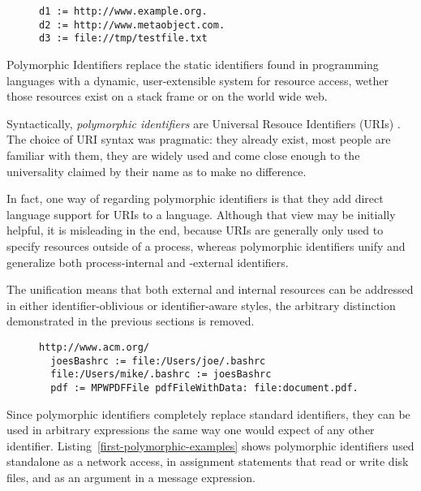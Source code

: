 \documentclass[preprint,authoryear]{acm_proc_article-sp}
\begin{document}
\begin{figure}[htbp]
\begin{lstlisting}[style=L,label=several-pis,caption=Corrected ideal factoring]
d1 := http://www.example.org.
d2 := http://www.metaobject.com.
d3 := file://tmp/testfile.txt
\end{lstlisting}
\end{figure}

Polymorphic Identifiers replace the static identifiers found in programming languages with
a dynamic, user-extensible system for resource access, wether those resources exist
on a stack frame or on the world wide web.

Syntactically, \emph{polymorphic identifiers} are Universal Resouce Identifiers (URIs) \cite{rfc3986}.
The choice of URI syntax was pragmatic:
they already exist, most people are familiar with them, they are widely used
and come close enough to the universality claimed by their name as to make no difference.

In fact, one way of regarding polymorphic identifiers is that they add direct language support
for URIs to a language.  Although that view may be initially helpful, it is misleading in
the end, because URIs are generally only used to specify resources outside of a process,
whereas polymorphic identifiers unify and generalize both process-internal and -external identifiers.

The unification means that both external and internal resources can be addressed in either
identifier-oblivious or identifier-aware styles, the arbitrary distinction demonstrated in
the previous sections is removed.

\begin{figure}[htbp]
\begin{lstlisting}[style=L,label=first-polymorphic-examples,caption=\emph{Polymorphic identifiers} in simple expressions.]
  http://www.acm.org/
  joesBashrc := file:/Users/joe/.bashrc
  file:/Users/mike/.bashrc := joesBashrc
  pdf := MPWPDFFile pdfFileWithData: file:document.pdf.
\end{lstlisting}
\end{figure}


Since polymorphic identifiers completely replace standard identifiers, they can be used
in arbitrary expressions the same way one would expect of any other identifier.  
Listing~\ref{first-polymorphic-examples} shows polymorphic identifiers used 
standalone as a network access, in assignment statements that read or write disk files,
and as an argument in a message expression.
\end{document}
